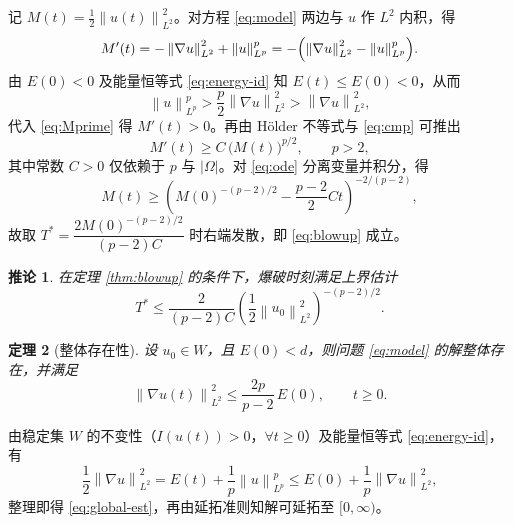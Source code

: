 \documentclass[12pt,a4paper,twoside,openright]{ctexbook}
\makeatletter
\numberwithin{figure}{chapter}
\numberwithin{table}{chapter}
\numberwithin{equation}{chapter}
\theoremstyle{ncwuthm}
\newtheorem{theorem}{定理}[chapter]
\newtheorem{corollary}[theorem]{推论}
\renewcommand{\proofname}{\upshape\zihao{-4}\heiti 证明}
\renewenvironment{proof}[1][\proofname]{\par
  \pushQED{\qed}%
  \normalfont \topsep6\p@\@plus6\p@\relax
  \trivlist
  \leftskip=2\ccwd
  \item[\hskip\labelsep\itshape#1\@addpunct{.}]%
  \ignorespaces
}{%
  \popQED\endtrivlist\@endpefalse
}
\newcommand{\norm}[1]{\left\lVert #1 \right\rVert}
\newcommand{\abs}[1]{\left\lvert #1 \right\rvert}
\makeatother
\begin{document}
\begin{proof}
记 $M(t)=\frac12\norm{u(t)}_{L^2}^2$。对方程 \eqref{eq:model} 两边与 $u$ 作 $L^2$ 内积，得
\begin{equation}
  M'(t) = -\norm{\nabla u}_{L^2}^2 + \norm{u}_{L^p}^p
        = -\Bigl( \norm{\nabla u}_{L^2}^2 - \norm{u}_{L^p}^p \Bigr) .
  \label{eq:Mprime}
\end{equation}
由 $E(0)<0$ 及能量恒等式 \eqref{eq:energy-id} 知 $E(t)\leq E(0)<0$，从而
\begin{equation}
  \norm{u}_{L^p}^p
  > \frac{p}{2}\norm{\nabla u}_{L^2}^2
  > \norm{\nabla u}_{L^2}^2 ,
  \label{eq:cmp}
\end{equation}
代入 \eqref{eq:Mprime} 得 $M'(t)>0$。再由 Hölder 不等式与 \eqref{eq:cmp} 可推出
\begin{equation}
  M'(t) \geq C\,\bigl(M(t)\bigr)^{p/2}, \qquad p>2 ,
  \label{eq:ode}
\end{equation}
其中常数 $C>0$ 仅依赖于 $p$ 与 $\abs{\Omega}$。对 \eqref{eq:ode} 分离变量并积分，得
\begin{equation}
  M(t) \geq \left( M(0)^{-(p-2)/2} - \frac{p-2}{2}Ct \right)^{-2/(p-2)} ,
  \label{eq:Mlower}
\end{equation}
故取 $T^*=\dfrac{2M(0)^{-(p-2)/2}}{(p-2)C}$ 时右端发散，即 \eqref{eq:blowup} 成立。
\end{proof}

\begin{corollary}
\label{cor:blowup-upper}
在定理 \ref{thm:blowup} 的条件下，爆破时刻满足上界估计
\begin{equation}
  T^* \leq \frac{2}{(p-2)C}\left(\frac12\norm{u_0}_{L^2}^2\right)^{-(p-2)/2} .
  \label{eq:Tupper}
\end{equation}
\end{corollary}

\begin{theorem}[整体存在性]
设 $u_0\in W$，且 $E(0)<d$，则问题 \eqref{eq:model} 的解整体存在，并满足
\begin{equation}
  \norm{\nabla u(t)}_{L^2}^2 \leq \frac{2p}{p-2}\,E(0),
  \qquad t\geq 0 .
  \label{eq:global-est}
\end{equation}
\end{theorem}

\begin{proof}
由稳定集 $W$ 的不变性（$I(u(t))>0$，$\forall t\geq 0$）及能量恒等式 \eqref{eq:energy-id}，有
\begin{equation}
  \frac12\norm{\nabla u}_{L^2}^2
  = E(t) + \frac1p\norm{u}_{L^p}^p
  \leq E(0) + \frac1p \norm{\nabla u}_{L^2}^2 ,
  \label{eq:est1}
\end{equation}
整理即得 \eqref{eq:global-est}，再由延拓准则知解可延拓至 $[0,\infty)$。
\end{proof}
\end{document}

